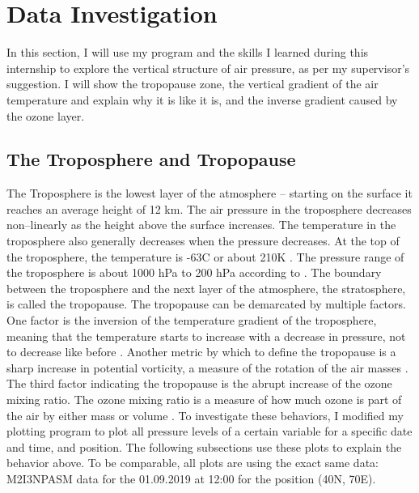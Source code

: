 \documentclass[../00_main.tex]{subfiles}
\begin{document}
\section{Data Investigation}

In this section, I will use my program and the skills I learned during this
internship to explore the vertical structure of air pressure, as per my
supervisor's suggestion. I will show the tropopause zone, the vertical gradient
of the air temperature and explain why it is like it is, and the inverse
gradient caused by the ozone layer.

\subsection{The Troposphere and Tropopause}

The Troposphere is the lowest layer of the atmosphere -- starting on the surface
it reaches an average height of 12 km.
The air pressure in the troposphere decreases non--linearly as the height above 
the surface increases.
The temperature in the troposphere also generally decreases when the pressure
decreases. At the top of the troposphere, the temperature is -63\textdegree{}C
or about 210K \cite{tropopause}. 
The pressure range of the troposphere is about 1000 hPa to 200 hPa according to
\cite{pressure}.\newline
The boundary between the troposphere and the next layer of the atmosphere,
the stratosphere, is called the tropopause. The tropopause can be demarcated
by multiple factors. One factor is the inversion of the temperature gradient of
the troposphere, meaning that the temperature starts to increase with
a decrease in pressure, not to decrease like before \cite{tropopause}.
Another metric by which to define the tropopause is a sharp increase in
potential vorticity, a measure of the rotation of the air masses \cite{tropopause}. 
The third factor indicating the tropopause is the abrupt increase of the ozone
mixing ratio. The ozone mixing ratio is a measure of how much ozone is part of
the air by either mass or volume \cite{atmosphere}.\newline
To investigate these behaviors, I modified my plotting program to plot all
pressure levels of a certain variable for a specific date and time, and
position. The following subsections use these plots to explain the behavior
above. To be comparable, all plots are using the exact same data: M2I3NPASM
data for the 01.09.2019 at 12:00 for the position (40\textdegree{}N,
70\textdegree{}E).
\end{document}
